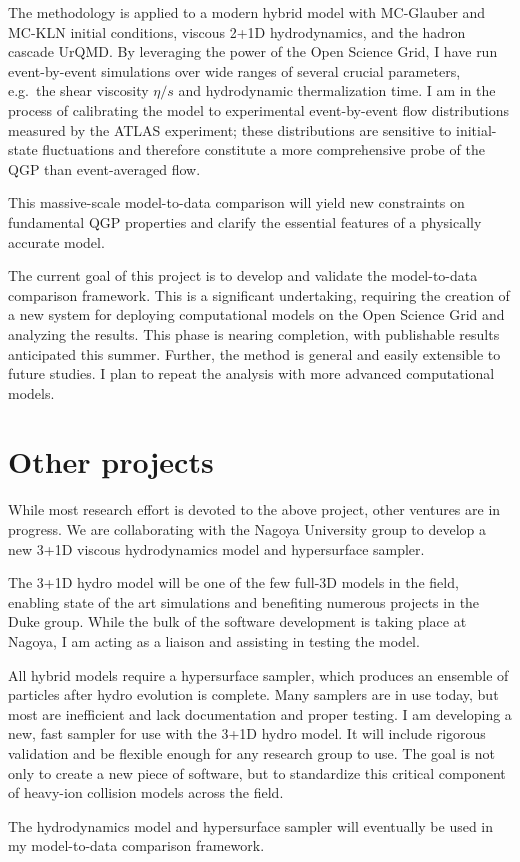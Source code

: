 \documentclass[letterpaper,10pt]{article}
\begin{document}
The methodology is applied to a modern hybrid model with MC-Glauber and MC-KLN initial conditions, viscous 2+1D hydrodynamics, and the
hadron cascade UrQMD.  By leveraging the power of the Open Science Grid, I have run event-by-event simulations over wide ranges of several
crucial parameters, e.g.\ the shear viscosity $\eta/s$ and hydrodynamic thermalization time.  I am in the process of calibrating the model
to experimental event-by-event flow distributions measured by the ATLAS experiment; these distributions are sensitive to initial-state
fluctuations and therefore constitute a more comprehensive probe of the QGP than event-averaged flow.

This massive-scale model-to-data comparison will yield new constraints on fundamental QGP properties and clarify the essential features of a
physically accurate model.

The current goal of this project is to develop and validate the model-to-data comparison framework.  This is a significant undertaking,
requiring the creation of a new system for deploying computational models on the Open Science Grid and analyzing the results.  This phase is
nearing completion, with publishable results anticipated this summer.  Further, the method is general and easily extensible to future
studies.  I plan to repeat the analysis with more advanced computational models.




\section{Other projects}

While most research effort is devoted to the above project, other ventures are in progress.  We are collaborating with the Nagoya
University group to develop a new 3+1D viscous hydrodynamics model and hypersurface sampler.

The 3+1D hydro model will be one of the few full-3D models in the field, enabling state of the art simulations and benefiting numerous
projects in the Duke group.  While the bulk of the software development is taking place at Nagoya, I am acting as a liaison and assisting in
testing the model.

All hybrid models require a hypersurface sampler, which produces an ensemble of particles after hydro evolution is complete.  Many samplers
are in use today, but most are inefficient and lack documentation and proper testing.  I am developing a new, fast sampler for use with the
3+1D hydro model.  It will include rigorous validation and be flexible enough for any research group to use.  The goal is not only to create
a new piece of software, but to standardize this critical component of heavy-ion collision models across the field.

The hydrodynamics model and hypersurface sampler will eventually be used in my model-to-data comparison framework.
\end{document}
